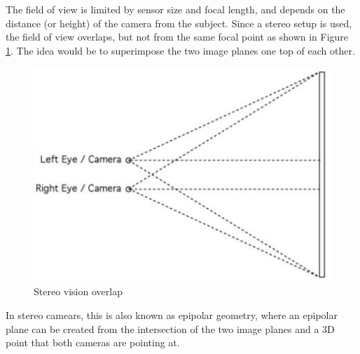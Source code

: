 The field of view is limited by sensor size and focal length, and depends on the distance (or height) of the camera from the subject. Since a stereo setup is used, the field of view overlaps, but not from the same focal point as shown in Figure \ref{fig:stereo_overlap}. The idea would be to superimpose the two image planes one top of each other.

\begin{figure}[H]
\centering
\includegraphics[scale=0.45]{images/stero_overlap.jpg}
\caption{Stereo vision overlap}
\label{fig:stereo_overlap}
\end{figure}

In stereo camears, this is also known as epipolar geometry, where an epipolar plane can be created from the intersection of the two image planes and a 3D point that both cameras are pointing at.

